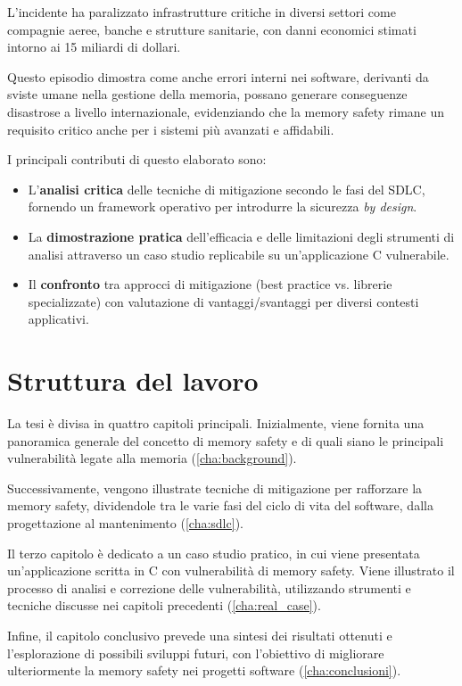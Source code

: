 L'incidente ha paralizzato infrastrutture critiche in diversi settori come
compagnie aeree, banche e strutture sanitarie, con danni economici stimati
intorno ai 15 miliardi di dollari.\cite{crowdstrike_bug_wired}\cite{crowdstrike_bug_wired_cost}

Questo episodio dimostra come anche errori interni nei software, derivanti da sviste
umane nella gestione della memoria, possano generare conseguenze disastrose a
livello internazionale, evidenziando che la memory safety rimane un requisito critico
anche per i sistemi più avanzati e affidabili.

\bigskip
\noindent
I principali contributi di questo elaborato sono:
\begin{itemize}
  \item L'\textbf{analisi critica} delle tecniche di mitigazione secondo le fasi
    del SDLC, fornendo un framework operativo per introdurre la sicurezza \textit{by
    design}.

  \item La \textbf{dimostrazione pratica} dell'efficacia e delle limitazioni
    degli strumenti di analisi attraverso un caso studio replicabile su un'applicazione
    C vulnerabile.

  \item Il \textbf{confronto} tra approcci di mitigazione (best practice vs.
    librerie specializzate) con valutazione di vantaggi/svantaggi per diversi contesti
    applicativi.
\end{itemize}

\section*{Struttura del lavoro}
\label{sec:structure} La tesi è divisa in quattro capitoli principali.
Inizialmente, viene fornita una panoramica generale del concetto di memory safety
e di quali siano le principali vulnerabilità legate alla memoria (\autoref{cha:background}).

Successivamente, vengono illustrate tecniche di mitigazione per rafforzare la
memory safety, dividendole tra le varie fasi del ciclo di vita del software,
dalla progettazione al mantenimento (\autoref{cha:sdlc}).

Il terzo capitolo è dedicato a un caso studio pratico, in cui viene presentata un'applicazione
scritta in C con vulnerabilità di memory safety. Viene illustrato il processo di
analisi e correzione delle vulnerabilità, utilizzando strumenti e tecniche discusse
nei capitoli precedenti (\autoref{cha:real_case}).

Infine, il capitolo conclusivo prevede una sintesi dei risultati ottenuti e l'esplorazione
di possibili sviluppi futuri, con l'obiettivo di migliorare ulteriormente la memory
safety nei progetti software (\autoref{cha:conclusioni}).
